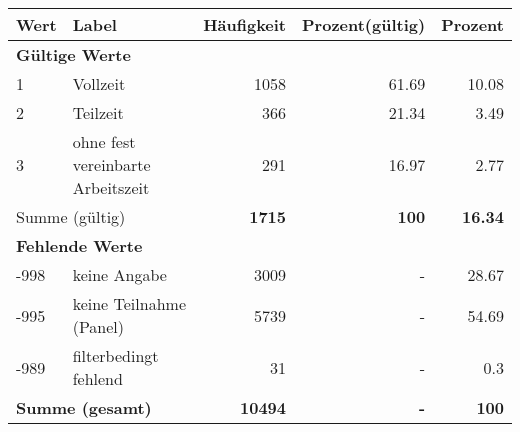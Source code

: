      \begin{longtable}{lXrrr}
     \toprule
     \textbf{Wert} & \textbf{Label} & \textbf{Häufigkeit} & \textbf{Prozent(gültig)} & \textbf{Prozent} \\
     \endhead
     \midrule
     \multicolumn{5}{l}{\textbf{Gültige Werte}}\\

     1 &
     \multicolumn{1}{X}{ Vollzeit   } &


       \num{1058} &
       \num[round-mode=places,round-precision=2]{61,69} &
         \num[round-mode=places,round-precision=2]{10,08} \\

     2 &
     \multicolumn{1}{X}{ Teilzeit   } &


       \num{366} &
       \num[round-mode=places,round-precision=2]{21,34} &
         \num[round-mode=places,round-precision=2]{3,49} \\

     3 &
     \multicolumn{1}{X}{ ohne fest vereinbarte Arbeitszeit   } &


       \num{291} &
       \num[round-mode=places,round-precision=2]{16,97} &
         \num[round-mode=places,round-precision=2]{2,77} \\
     \midrule
     \multicolumn{2}{l}{Summe (gültig)} &
       \textbf{\num{1715}} &
     \textbf{100} &
       \textbf{\num[round-mode=places,round-precision=2]{16,34}} \\
     \multicolumn{5}{l}{\textbf{Fehlende Werte}}\\
       -998 &
       keine Angabe &
         \num{3009} &
        - &
         \num[round-mode=places,round-precision=2]{28,67} \\
       -995 &
       keine Teilnahme (Panel) &
         \num{5739} &
        - &
         \num[round-mode=places,round-precision=2]{54,69} \\
       -989 &
       filterbedingt fehlend &
         \num{31} &
        - &
         \num[round-mode=places,round-precision=2]{0,3} \\
     \midrule
     \multicolumn{2}{l}{\textbf{Summe (gesamt)}} &
          \textbf{\num{10494}} &
        \textbf{-} &
        \textbf{100} \\
     \bottomrule
     \end{longtable}
     
